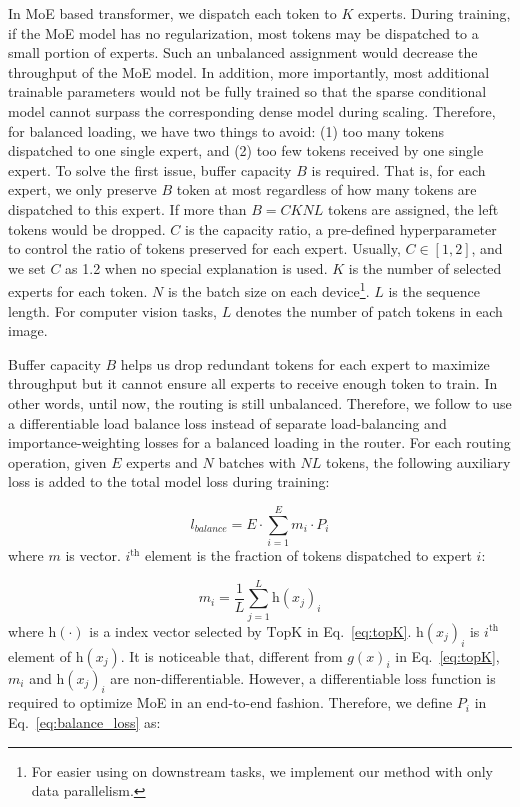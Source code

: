 \documentclass[letterpaper]{article} %
\begin{document}


In MoE based transformer, we dispatch each token to $K$ experts. During training, if the MoE model has no regularization, most tokens may be dispatched to a small portion of experts. Such an unbalanced assignment would decrease the throughput of the MoE model. In addition, more importantly, most additional trainable parameters would not be fully trained so that the sparse conditional model cannot surpass the corresponding dense model during scaling. Therefore, for balanced loading, we have two things to avoid: (1) too many tokens dispatched to one single expert, and (2) too few tokens received by one single expert. To solve the first issue, buffer capacity $B$ is required. That is, for each expert, we only preserve $B$ token at most regardless of how many tokens are dispatched to this expert. If more than $B=CKNL$ tokens are assigned, the left tokens would be dropped. $C$ is the capacity ratio, a pre-defined hyperparameter to control the ratio of tokens preserved for each expert. Usually, $C\in[1,2]$, and we set $C$ as 1.2 when no special explanation is used. $K$ is the number of selected experts for each token. $N$ is the batch size on each device\footnote{For easier using on downstream tasks, we implement our method with only data parallelism.}. $L$ is the sequence length. For computer vision tasks, $L$ denotes the number of patch tokens in each image. 

Buffer capacity $B$ helps us drop redundant tokens for each expert to maximize throughput but it cannot ensure all experts to receive enough token to train. In other words, until now, the routing is still unbalanced. Therefore, we follow \citet{fedus2021switch} to use a differentiable load balance loss instead of separate load-balancing and importance-weighting losses for a balanced loading in the router. For each routing operation, given $E$ experts and $N$ batches with $NL$ tokens, the following auxiliary loss is added to the total model loss during training: 


\begin{equation}\label{eq:balance_loss}
l_{balance} = E \cdot \sum_{i=1}^E m_i \cdot P_i
\end{equation}
where $m$ is vector. $i^{\mathrm{th}}$ element is the fraction of tokens dispatched to expert $i$:

\begin{equation}
m_i = \frac{1}{L} \sum_{j=1}^{L} \mathrm{h}(x_j)_i
\end{equation}
where $\mathrm{h}(\cdot)$ is a index vector selected by $\mathrm{TopK}$ in Eq.~\ref{eq:topK}. $\mathrm{h}(x_j)_i$ is $i^{\mathrm{th}}$ element of $\mathrm{h}(x_j)$. It is noticeable that, different from $g(x)_i$ in Eq.~\ref{eq:topK}, $m_i$ and $\mathrm{h}(x_j)_i$ are non-differentiable. However, a differentiable loss function is required to optimize MoE in an end-to-end fashion. Therefore, we define $P_i$ in Eq.~\ref{eq:balance_loss} as:
\end{document}
